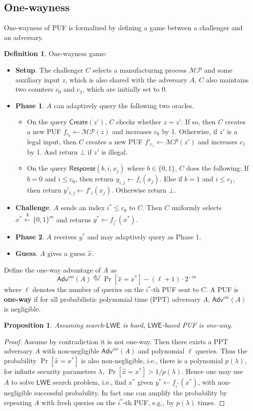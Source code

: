 \documentclass[12pt]{article}
\newcommand{\eqdef}{\stackrel{def}{=}}
\newcommand{\bits}{\{0,1\}}
\newcommand{\getsr}{\stackrel{\$}{\gets}}
\newcommand{\Adv}{\mathsf{Adv}}
\newcommand{\LWE}{\mathsf{LWE}}
\newcommand{\MP}{\mathcal{MP}}
\newcommand{\Create}{\mathsf{Create}}
\newcommand{\Response}{\mathsf{Response}}
\newtheorem{proposition}[theorem]{Proposition}
\theoremstyle{definition}
\newtheorem{definition}[theorem]{Definition}
\begin{document}
\subsection{One-wayness}
One-wayness of PUF is formalized by defining a game between a challenger and an adversary.
\begin{definition}
\label{def:ow}
One-wayness game:
\begin{itemize}
\item {\bf Setup}. The challenger $C$ selects a manufacturing process $\MP$ and some auxiliary input $z$, which is also shared with the adversary $A$. $C$ also maintains two counters $c_0$ and $c_1$, which are initially set to 0.
\item {\bf Phase 1}. $A$ can adaptively query the following two oracles.
	\begin{itemize}
	\item On the query $\Create(z')$, $C$ checks whether $z=z'$. If so, then $C$ creates a new PUF $f_{c_0} \gets \MP(z)$ and increases $c_0$ by 1. Otherwise, if $z'$ is a legal input, then $C$ creates a new PUF $f'_{c_1} \gets \MP(z')$ and increases $c_1$ by 1. And return $\bot$ if $z'$ is illegal.
	\item On the query $\Response(b,i,x_j)$ where $b\in\bits$, $C$ does the following: If $b=0$ and $i \leq c_0$, then return $y_{i,j} \gets f_{i}(x_j)$. Else if $b=1$ and $i \leq c_1$, then return $y'_{i,j} \gets f'_{i}(x_j)$. Otherwise return $\bot$.
	\end{itemize}
\item {\bf Challenge}. $A$ sends an index $i^* \leq c_0$ to $C$. Then $C$ uniformly selects $x^* \getsr \bits^m$ and returns $y^* \gets f_{i^*}(x^*)$.
\item {\bf Phase 2}. $A$ receives $y^*$ and may adaptively query as Phase 1.
\item {\bf Guess}. $A$ gives a guess $\hat{x}$.
\end{itemize}
Define the one-way advantage of $A$ as
$$\Adv^{ow}(A) \eqdef \Pr[\hat{x} = x^*] - (\ell + 1) \cdot 2^{-m}$$
where $\ell$ denotes the number of queries on the $i^*$-th PUF sent to $C$. A PUF is {\bf one-way} if for all probabilistic polynomial time (PPT) adversary $A$, $\Adv^{ow}(A)$ is negligible.
\end{definition}

\begin{proposition}
Assuming search-$\LWE$ is hard, $\LWE$-based PUF is one-way.
\end{proposition}
\begin{proof}
Assume by contradiction it is not one-way. Then there exists a PPT adversary $A$ with non-negligible $\Adv^{ow}(A)$ and polynomial $\ell$ queries. Thus the probability $\Pr[\hat{x} = x^*]$ is also non-negligible, i.e., there is a polynomial $p(\lambda)$, for infinite security parameters $\lambda$, $\Pr[\hat{x} = x^*] > 1/p(\lambda)$. Hence one may use $A$ to solve $\LWE$ search problem, i.e., find $x^*$ given $y^* \gets f_{i^*}(x^*)$, with non-negligible successful probability. In fact one can amplify the probability by repeating $A$ with fresh queries on the $i^*$-th PUF, e.g., by $p(\lambda)$ times.
\end{proof}
\end{document}
